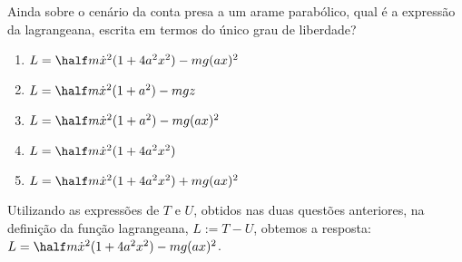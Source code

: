 \begin{question}
    Ainda sobre o cenário da conta presa a um arame parabólico, qual é a expressão da lagrangeana, escrita em termos do único grau de liberdade?
    \begin{enumerate}
      \item $L = \half m \dot x^2 (1 + 4a^2 x^2) - mg(ax)^2$ \rightanswer
      \item $L = \half m \dot x^2 (1 + a^2) - mgz$
      \item $L = \half m \dot x^2 (1 + a^2) - mg(ax)^2$
      \item $L = \half m \dot x^2 (1 + 4a^2 x^2)$
      \item $L = \half m \dot x^2 (1 + 4a^2 x^2) + mg(ax)^2$
    \end{enumerate}

    \begin{solution}
      Utilizando as expressões de $T$ e $U$, obtidos nas duas questões anteriores, na definição da função lagrangeana, $L := T - U$, obtemos a resposta: $L = \half m \dot x^2 (1 + 4a^2 x^2) - mg(ax)^2$.
    \end{solution}
\end{question}